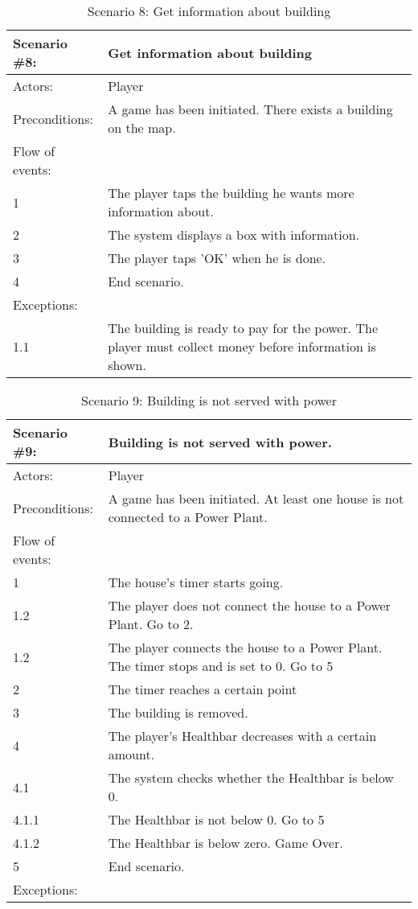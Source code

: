 \begin{table}
	\begin{tabular}{| l | p{10cm} |}
		\hline
		\rowcolor{lightgray}
		{\bf Scenario \#8:} & {\bf Get information about building} \\ \hline
		Actors: & Player \\ \hline
		Preconditions: & A game has been initiated. There exists a building on the map. \\ \hline
		\rowcolor{lightergray}
		Flow of events: & \\ \hline
		1 & The player taps the building he wants more information about. \\ \hline
		2 & The system displays a box with information. \\ \hline
		3 & The player taps 'OK' when he is done. \\ \hline
		4 & End scenario. \\ \hline
		\rowcolor{lightergray}
		Exceptions: & \\ \hline
		1.1 & The building is ready to pay for the power. The player must collect money before information is shown. \\ \hline
	\end{tabular}
\caption{Scenario 8: Get information about building}
\end{table}

\begin{table}
	\begin{tabular}{| l | p{10cm} |}
		\hline
		\rowcolor{lightgray}
		{\bf Scenario \#9:} & {\bf Building is not served with power.} \\ \hline
		Actors: & Player \\ \hline
		Preconditions: & A game has been initiated. At least one house is not connected to a Power Plant. \\ \hline
		\rowcolor{lightergray}
		Flow of events: & \\ \hline
		1 & The house's timer starts going. \\ \hline
		1.2 & The player does not connect the house to a Power Plant. Go to 2. \\ \hline
		1.2 & The player connects the house to a Power Plant. The timer stops and is set to 0. Go to 5 \\ \hline
		2 & The timer reaches a certain point \\ \hline
		3 & The building is removed. \\ \hline
		4 & The player's Healthbar decreases with a certain amount. \\ \hline
		4.1 & The system checks whether the Healthbar is below 0. \\ \hline
		4.1.1 & The Healthbar is not below 0. Go to 5 \\ \hline
		4.1.2 & The Healthbar is below zero. Game Over. \\ \hline
		5 & End scenario. \\ \hline
		\rowcolor{lightergray}
		Exceptions: & \\ \hline	
	\end{tabular}
	\caption{Scenario 9: Building is not served with power}
\end{table}


